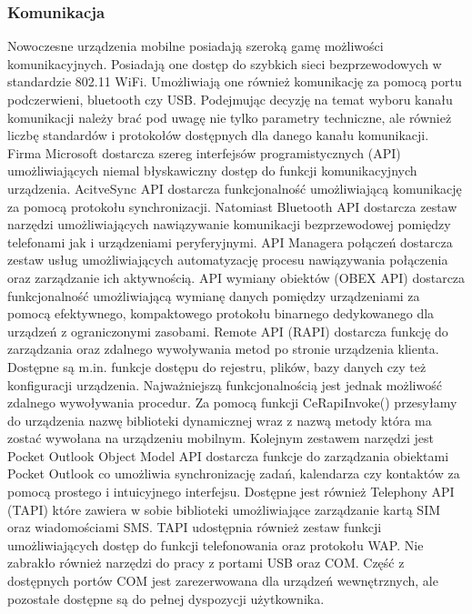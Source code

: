 \subsubsection{Komunikacja}
Nowoczesne urządzenia mobilne posiadają szeroką gamę możliwości komunikacyjnych.
Posiadają one dostęp do szybkich sieci bezprzewodowych w standardzie 802.11
WiFi. Umożliwiają one również komunikację za pomocą portu podczerwieni,
bluetooth czy USB. Podejmując decyzję na temat wyboru kanału komunikacji należy
brać pod uwagę nie tylko parametry techniczne, ale również liczbę standardów i
protokołów dostępnych dla danego kanału komunikacji. Firma Microsoft dostarcza
szereg interfejsów programistycznych (API) umożliwiających niemal błyskawiczny
dostęp do funkcji komunikacyjnych urządzenia. AcitveSync API dostarcza funkcjonalność
umożliwiającą komunikację za pomocą protokołu synchronizacji. Natomiast
Bluetooth API dostarcza zestaw narzędzi umożliwiających nawiązywanie komunikacji
bezprzewodowej pomiędzy telefonami jak i urządzeniami peryferyjnymi.  API
Managera połączeń dostarcza zestaw usług umożliwiających automatyzację procesu
nawiązywania połączenia oraz zarządzanie ich aktywnością. API wymiany obiektów
(OBEX API) dostarcza funkcjonalność umożliwiającą wymianę danych pomiędzy
urządzeniami za pomocą efektywnego, kompaktowego protokołu binarnego
dedykowanego dla urządzeń z ograniczonymi zasobami. Remote API (RAPI) dostarcza
funkcję do zarządzania oraz zdalnego wywoływania metod po stronie
urządzenia klienta. Dostępne są m.in. funkcje dostępu do rejestru, plików, bazy
danych czy też konfiguracji urządzenia. Najważniejszą funkcjonalnością jest
jednak możliwość zdalnego wywoływania procedur. Za pomocą funkcji
CeRapiInvoke() przesyłamy do urządzenia nazwę biblioteki dynamicznej wraz z
nazwą metody która ma zostać wywołana na urządzeniu mobilnym. Kolejnym zestawem
narzędzi jest Pocket Outlook Object Model API dostarcza funkcje do zarządzania
obiektami Pocket Outlook  co umożliwia synchronizację zadań, kalendarza czy
kontaktów za pomocą prostego i intuicyjnego interfejsu. Dostępne jest również
Telephony API (TAPI) które zawiera w sobie biblioteki umożliwiające zarządzanie
kartą SIM oraz wiadomościami SMS. TAPI udostępnia również zestaw funkcji
umożliwiających dostęp do funkcji telefonowania oraz protokołu WAP. Nie
zabrakło również narzędzi do pracy z portami USB oraz COM. Część z dostępnych portów COM
jest zarezerwowana dla urządzeń wewnętrznych, ale pozostałe dostępne są do
pełnej dyspozycji użytkownika.

